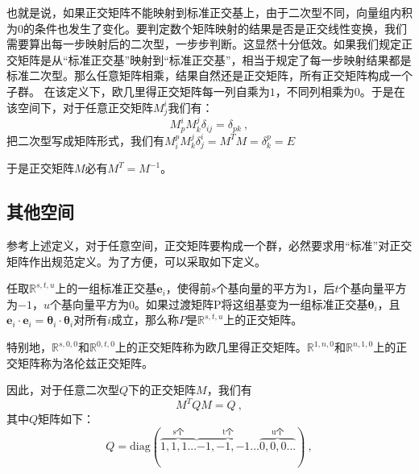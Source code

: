 也就是说，如果正交矩阵不能映射到标准正交基上，由于二次型不同，向量组内积为0的条件也发生了变化。要判定数个矩阵映射的结果是否是正交线性变换，我们需要算出每一步映射后的二次型，一步步判断。这显然十分低效。如果我们规定正交矩阵是从“标准正交基”映射到“标准正交基”，相当于规定了每一步映射结果都是标准二次型。那么任意矩阵相乘，结果自然还是正交矩阵，所有正交矩阵构成一个子群。
在该定义下，欧几里得正交矩阵每一列自乘为$1$，不同列相乘为$0$。于是在该空间下，对于任意正交矩阵$M^i_j$我们有：
\begin{equation}
M^i_pM^j_k\delta_{ij}=\delta_{pk}~,
\end{equation}
把二次型写成矩阵形式，我们有$M^p_iM^j_k\delta^i_j=M^T M=\delta^p_k=E$

于是正交矩阵$M$必有$M^T=M^{-1}$。
\subsection{其他空间}
参考上述定义，对于任意空间，正交矩阵要构成一个群，必然要求用“标准”对正交矩阵作出规范定义。为了方便，可以采取如下定义。
\begin{definition}{}
任取$\mathbb R^{s,t,u}$上的一组标准正交基${\boldsymbol{e}_i}$，使得前$s$个基向量的平方为$1$，后$t$个基向量平方为$-1$，$u$个基向量平方为$0$。如果过渡矩阵P将这组基变为一组标准正交基${\boldsymbol{\theta}_i}$，且$\boldsymbol{e}_i\cdot \boldsymbol{e}_i=\boldsymbol{\theta}_i\cdot\boldsymbol{\theta}_i$对所有$i$成立，那么称$P$是$\mathbb R^{s,t,u}$上的正交矩阵。

特别地，$\mathbb R^{s,0,0}$和$\mathbb R^{0,t,0}$上的正交矩阵称为欧几里得正交矩阵。$\mathbb R^{1,n,0}$和$\mathbb R^{n,1,0}$上的正交矩阵称为洛伦兹正交矩阵。
\end{definition}
因此，对于任意二次型$Q$下的正交矩阵$M$，我们有
\begin{equation}
M^TQM=Q~,
\end{equation}
其中$Q$矩阵如下：
\begin{equation}
Q=\mathrm{diag}(\overbrace{1,1,1...}^{\text{s个}}\overbrace{-1,-1,-1...}^{\text{t个}}\overbrace{0,0,0...}^{\text{u个}})~,
\end{equation}